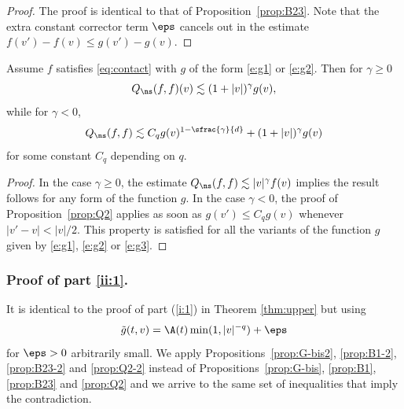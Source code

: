 \begin{proof}
The proof is identical to that of Proposition~\ref{prop:B23}. Note
that the extra constant corrector term $\eps$ cancels out in the estimate
$f(v') - f(v) \leq g(v') - g(v)$.
\end{proof}

\begin{prop}[Estimate of $Q_{\ns}(f,f)$] \label{prop:Q2-2} Assume $f$
satisfies \eqref{eq:contact} with $g$ of the form \eqref{e:g1} or
\eqref{e:g2}. Then for $\gamma \ge 0$
\[ Q_{\ns}(f,f)(v) \lesssim (1+|v|)^{\gamma} g(v), \]
while for $\gamma <0$,
\[
Q_{\ns}(f,f) \lesssim C_q g(v)^{1-\sfrac{\gamma}{d}} +
(1+|v|)^\gamma g(v)
\]
for some constant $C_q$ depending on $q$.
\end{prop}

\begin{proof}
In the case $\gamma \geq 0$, the estimate
$Q_{\ns}(f,f) \lesssim |v|^{\gamma} f(v)$ implies the result follows
for any form of the function $g$. In the case $\gamma < 0$, the
proof of Proposition~\ref{prop:Q2} applies as soon as
$g(v') \leq C_q g(v)$ whenever $|v'-v| < |v|/2$. This property is
satisfied for all the variants of the function $g$ given by
\eqref{e:g1}, \eqref{e:g2} or \eqref{e:g3}.
\end{proof}


\subsubsection{Proof of part \eqref{ii:1}.} It is identical
to the proof of part (\ref{i:1}) in Theorem \ref{thm:upper} but using
\[\tilde g(t,v) = \A(t) \min(1,|v|^{-q}) + \eps\] for $\eps > 0$ arbitrarily
small. We apply Propositions~\ref{prop:G-bis2}, \ref{prop:B1-2},
\ref{prop:B23-2} and \ref{prop:Q2-2} instead of
Propositions~\ref{prop:G-bis}, \ref{prop:B1}, \ref{prop:B23} and
\ref{prop:Q2} and we arrive to the same set of inequalities that imply
the contradiction.

